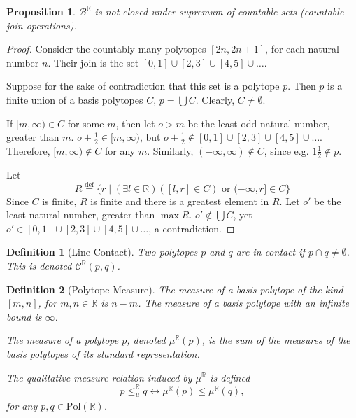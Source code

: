 \documentclass{article}
\newtheorem*{definition}{Definition}
\newtheorem*{proposition}{Proposition}
\newcommand{\R}{\mathbb{R}}
\newcommand{\B}{\mathcal{B}}
\newcommand{\bcont}{\mathcal{C}^\R}
\newcommand{\bmeasure}{\leq_\mu^\R}
\newcommand{\Pol}{\text{Pol}}
\newcommand{\eqdef}{\stackrel{\text{def}}{=}}
\begin{document}
\begin{proposition}
  $\B^\R$ is not closed under supremum of countable sets (countable join operations).
\end{proposition}
\begin{proof}
  Consider the countably many polytopes $[2n, 2n+1]$, for each natural number $n$. Their join is the set $[0, 1] \cup [2, 3] \cup [4, 5] \cup \dots$.

  Suppose for the sake of contradiction that this set is a polytope $p$. Then $p$ is a finite union of a basis polytopes $C$, $p = \bigcup C$. Clearly, $C \neq \emptyset$.

  If $[m, \infty) \in C$ for some $m$, then let $o > m$ be the least odd natural number, greater than $m$. $o + \frac{1}{2} \in [m, \infty)$, but $o + \frac{1}{2} \not \in [0, 1] \cup [2, 3] \cup [4, 5] \cup \dots$. Therefore, $[m, \infty) \not \in C$ for any $m$. Similarly, $(-\infty, \infty) \not \in C$, since e.g. $1\frac{1}{2} \not \in p$.

        Let
        \[
        R \eqdef \{r \mid (\exists l \in \R)([l, r] \in C) \text{ or } (-\infty, r] \in C\}
        \]
        Since $C$ is finite, $R$ is finite and there is a greatest element in $R$. Let $o'$ be the least natural number, greater than $\max R$. $o' \not \in \bigcup C$, yet $o' \in [0, 1] \cup [2, 3] \cup [4, 5] \cup \dots$, a contradiction.
\end{proof}

\begin{definition}[Line Contact]
Two polytopes $p$ and $q$ are \emph{in contact} if $p \cap q \neq \emptyset$. This is denoted $\bcont(p, q)$.
\end{definition}

\begin{definition}[Polytope Measure]
  The measure of a basis polytope of the kind $[m, n]$, for $m, n \in \R$ is $n-m$. The measure of a basis polytope with an infinite bound is $\infty$.

  The \emph{measure} of a polytope $p$, denoted $\mu^\R(p)$, is the sum of the measures of the basis polytopes of its standard representation.

The \emph{qualitative measure relation induced by} $\mu^\R$ is defined
\begin{equation*}
  p \bmeasure q \leftrightarrow \mu^\R(p) \leq \mu^\R(q),
\end{equation*}
  for any $p, q \in \Pol(\R)$.
\end{definition}
\end{document}
